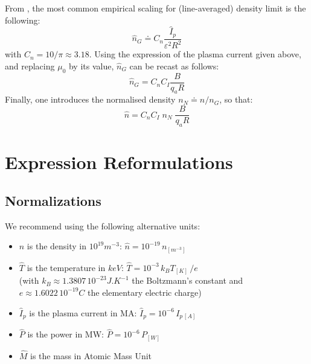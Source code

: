 From \cite[eq.(14.146)]{Freidberg2007}, the most common empirical scaling for (line-averaged) density limit is the following:
\begin{equation}
\boxed{\hat n_G \doteq C_n \frac{\hat I_p}{\varepsilon^2 R^2}  }
\label{eqn:greenwald_density}
\end{equation}
with $C_n = 10/\pi \approx 3.18$.
Using the expression of the plasma current given above, and replacing $\mu_0$ by its value, $\hat n_G$ can be recast as follows:
\begin{equation*}
\hat n_G = C_nC_I \frac{B}{q_aR}
\end{equation*}
Finally, one introduces the normalised density $n_N\doteq n/ n_G$, so that:
\begin{equation}
\hat n = C_nC_I\; n_N\; \frac{B}{q_aR}
\label{eq:n_nN}
\end{equation}



\section{Expression Reformulations}
\subsection{Normalizations}
We recommend using the following alternative units: 
\begin{itemize}
    \item $\hat n$ is the density in $10^{19} \si{m^{-3}}$: 
    $\hat n = 10^{-19}\,n_{\si{[m^{-3}]}}$
    \item $\hat T$ is the temperature in $keV$: $\hat T = 10^{-3}\, k_B T_{[K]}\,/e$ \\(with $k_B \approx 1.3807\, 10^{-23} \si{J.K^{-1}}$ the Boltzmann's constant and $e\approx 1.6022\, 10^{-19}C$ the elementary electric charge)
    \item $\hat I_p$ is the plasma current in MA: $\hat I_p = 10^{-6}\,I_{p\,[A]}$
    \item $\hat P$ is the power in MW: $\hat P = 10^{-6}\, P_{[W]}$
    \item $\hat M$ is the mass in Atomic Mass Unit
\end{itemize}



